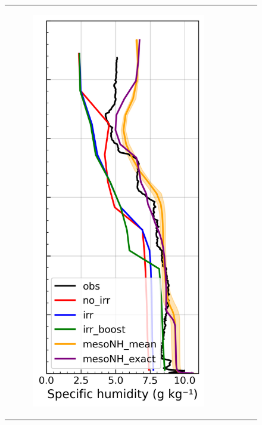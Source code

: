 \begin{figure}[hbtp]
{\begin{tabular}{@{}cccc@{}}
\begin{subfigure}[t]{0.289\textwidth}
            \caption{}
            \includegraphics[width=\textwidth]{images/chap5/profiles/profile_cendrosa_ovap_2007_.png}

\end{subfigure}
\end{tabular}}
\end{figure}
